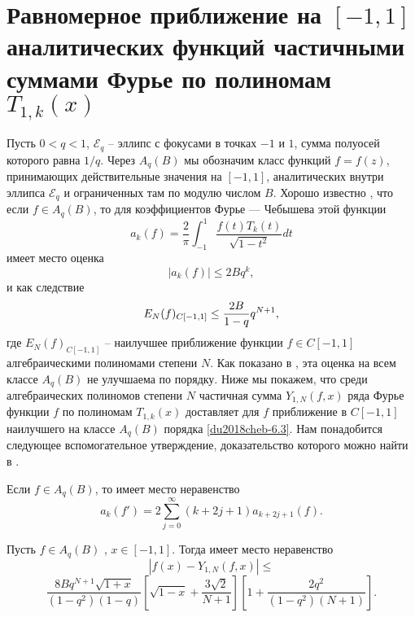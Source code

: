 \section{Равномерное приближение на $[-1,1]$ аналитических функций частичными суммами Фурье по полиномам $T_{1,k}(x)$}
Пусть $0<q<1$, $\mathcal{E}_q$ -- эллипс с фокусами в точках
$-1$ и $1$, сумма полуосей которого равна $1/q$.
Через $A_q(B)$ мы обозначим класс функций $f=f(z)$,
принимающих действительные значения на $[-1,1]$, аналитических
внутри эллипса $\mathcal{E}_q$ и ограниченных там по модулю числом
$B$. Хорошо известно \cite{Timan}, что если
$f\in A_q(B)$, то для коэффициентов Фурье --- Чебышева этой функции
\begin{equation}\label{du2018cheb-6.1}
a_k(f)=\frac{2}{\pi}\int_{-1}^{1}\frac{f(t)T_k(t)}{\sqrt{1-t^2}}dt
\end{equation}
имеет место оценка
\begin{equation}\label{du2018cheb-6.2}
|a_k(f)|\le2Bq^k,
\end{equation}
и как следствие
\begin{equation}\label{du2018cheb-6.3}
E_N(f)_{C[-1,1]}\le{2B\over1-q}q^{N+1},
\end{equation}
где $E_N(f)_{C[-1,1]}$ -- наилучшее приближение функции $f\in C[-1,1]$ алгебраическими полиномами степени $N$. Как показано в \cite{du2018cheb-Ahiezer}, эта оценка на всем классе  $A_q(B)$ не улучшаема по порядку.  Ниже мы  покажем, что среди алгебраических полиномов степени $N$ частичная сумма $Y_{1,N}(f,x)$ ряда Фурье функции $f$ по полиномам $T_{1,k}(x)$    доставляет для $f$ приближение в $C[-1,1]$ наилучшего на классе $A_q(B)$ порядка \eqref{du2018cheb-6.3}. Нам понадобится следующее    вспомогательное утверждение, доказательство которого можно найти  в \cite{Pash}.
\begin{lemma}\label{du2018cheb-lemC} Если $f\in A_q(B)$, то имеет место неравенство
	$$
	a_k(f')=2\sum_{j=0}^\infty(k+2j+1)a_{k+2j+1}(f).
	$$
\end{lemma}

\begin{theorem} \label{du2018cheb-th4}    Пусть  $f\in A_q(B)$ , $x\in[-1,1]$. Тогда имеет  место неравенство
	$$
	|f(x)- Y_{1,N}(f,x)|\le
	$$
	$$
	\frac{8Bq^{N+1}\sqrt{1+x}}{(1-q^2)(1-q)}\left[\sqrt{1-x}+\frac{3\sqrt{2}}{N+1}\right]\left[1+
	\frac{2q^2}{(1-q^2)(N+1)}\right].
	$$
\end{theorem}



